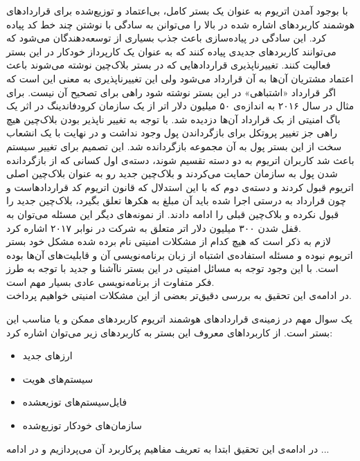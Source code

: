 با بوجود آمدن اتریوم به عنوان یک بستر کامل، بی‌اعتماد و توزیع‌شده برای قرارداد‌های هوشمند کاربرد‌های اشاره شده در بالا را می‌توانن به سادگی با نوشتن چند خط کد پیاده کرد. این سادگی در پیاده‌سازی باعث جذب بسیاری از توسعه‌دهندگان می‌شود که می‌توانند کاربردهای جدیدی پیاده‌ کنند که به عنوان یک کارپرداز خودکار در این بستر فعالیت کنند. تغییرناپذیری قرارداد‌هایی که در بستر بلاک‌چین نوشته می‌شوند باعث اعتماد مشتریان آن‌ها به آن قرارداد می‌شود ولی این تغییرناپذیری به معنی این است که اگر قرارداد «اشتباهی» در این بستر نوشته شود راهی برای تصحیح آن نیست. برای مثال در سال ۲۰۱۶ به اندازه‌ی ۵۰ میلیون دلار اتر از یک سازمان کرودفاندینگ در اثر یک باگ امنیتی از بک قرارداد آن‌ها دزدیده شد. با توجه به تغییر ناپذیر بودن بلاک‌چین هیچ راهی جز تغییر پروتکل برای بازگرداندن پول وجود نداشت و در نهایت با یک انشعاب سخت از این بستر پول به آن مجموعه بازگردانده شد. این تصمیم برای تغییر سیستم باعث شد کاربران اتریوم به دو دسته تقسیم شوند، دسته‌ی اول کسانی که از بازگردانده شدن پول به سازمان حمایت می‌کردند و بلاک‌چین جدید رو به عنوان بلاک‌چین اصلی اتریوم قبول کردند و دسته‌ی دوم که با این استدلال که قانون اتریوم کد قراردادهاست و چون قرارداد به درستی اجرا شده باید آن مبلغ به هکرها تعلق بگیرد، بلاک‌چین جدید را قبول نکرده و بلاک‌چین قبلی را ادامه دادند. از نمونه‌های دیگر این مسئله می‌توان به قفل شدن ۳۰۰ میلیون دلار اتر متعلق به شرکت
 در نوابر ۲۰۱۷ اشاره کرد. 
 \\
 لازم به ذکر است که هیچ کدام از مشکلات امنیتی نام برده شده مشکل خود بستر اتریوم نبوده و مسئله استفاده‌ی اشتباه از زبان برنامه‌نویسی آن و قابلیت‌های آن‌ها بوده است. با این وجود توجه به مسائل امنیتی در این بستر ناآشنا و جدید با توجه به طرز فکر متفاوت از برنامه‌نویسی عادی بسیار مهم است. 
 \\
 در ادامه‌ی این تحقیق به بررسی دقیق‌تر بعضی از این مشکلات امنیتی خواهیم پرداخت. 
 \par
 
 یک سوال مهم در زمینه‌ی قراردادهای هوشمند اتریوم کاربردهای ممکن و یا مناسب این بستر است. از کاربرداهای معروف این بستر به کاربرد‌های زیر می‌توان اشاره کرد: 
 \begin{itemize}
 	\item 
 	ارز‌های جدید
 	\item
 	سیستم‌های هویت
 	\item
 	فایل‌سیستم‌های توزیعشده
 	\item
 	سازمان‌های خودکار توزیع‌شده
 \end{itemize}
\par
در ادامه‌ی این تحقیق ابتدا به تعریف مفاهیم پرکاربرد آن می‌پردازیم و در ادامه ... 

